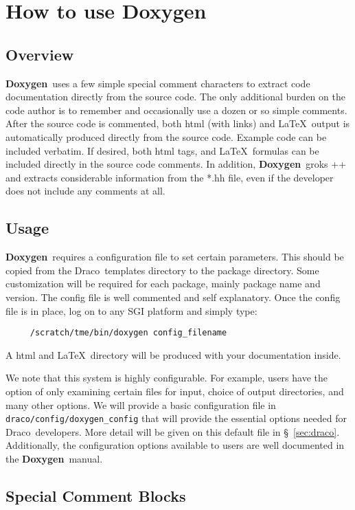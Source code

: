 \documentclass[11pt]{nmemo}
\newcommand{\draco}{{\normalfont\sffamily Draco}}
\newcommand{\doxy}{{\normalfont\bfseries Doxygen}}
\begin{document}
\section{How to use \doxy\ }

\subsection{Overview}

\doxy\ uses a few simple special comment characters to extract code
documentation directly from the source code. The only additional burden
on the code author is to remember and occasionally use a dozen or so
simple comments. After the source code is commented, both html (with links)
and \LaTeX\ output is automatically produced directly from the source code.
Example code can be included verbatim. If desired, both  html tags, and \LaTeX\
formulas can be included directly in the source code comments. In addition,
\doxy\ groks \C++ and extracts considerable information from the *.hh
file, even if the developer does not include any comments at all.

\subsection{Usage}

\doxy\ requires a configuration file to set certain parameters. This
should be copied from the \draco\ templates directory to the package
directory.  Some customization will be required for each package,
mainly package name and version. The config file is well commented and
self explanatory. Once the config file is in place, log on to any SGI
platform and simply type:
\begin{verbatim} 
     /scratch/tme/bin/doxygen config_filename
\end{verbatim}
A html and \LaTeX\ directory will be produced with your documentation 
inside.  

We note that this system is highly configurable.  For example, users
have the option of only examining certain files for input, choice of
output directories, and many other options.  We will provide a basic
configuration file in \texttt{draco/config/doxygen\_config} that will
provide the essential options needed for \draco\ developers.  More
detail will be given on this default file in \S~\ref{sec:draco}.
Additionally, the configuration options available to users are well
documented in the \doxy\ manual.

\subsection{Special Comment Blocks}
\end{document}
